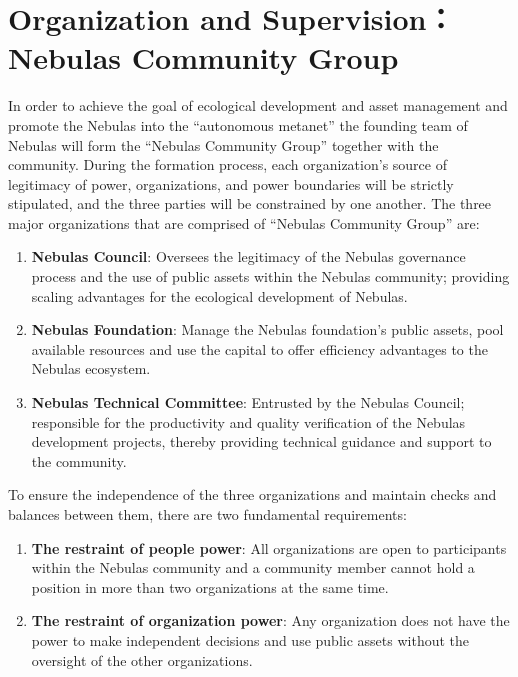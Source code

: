 \section{Organization and Supervision：Nebulas Community Group}

In order to achieve the goal of ecological development and asset management and promote the Nebulas into the “autonomous metanet” the founding team of Nebulas will form the “Nebulas Community Group” together with the community. During the formation process, each organization’s source of legitimacy of power, organizations, and power boundaries will be strictly stipulated, and the three parties will be constrained by one another. The three major organizations that are comprised of “Nebulas Community Group” are:

\begin{enumerate}
	\item \textbf{Nebulas Council}: Oversees the legitimacy of the Nebulas governance process and the use of public assets within the Nebulas community; providing scaling advantages for the ecological development of Nebulas.
	\item \textbf{Nebulas Foundation}: Manage the Nebulas foundation’s public assets, pool available resources and use the capital to offer efficiency advantages to the Nebulas ecosystem.
	\item \textbf{Nebulas Technical Committee}: Entrusted by the Nebulas Council; responsible for the productivity and quality verification of the Nebulas development projects, thereby providing technical guidance and support to the community.
\end{enumerate}

\vspace{2em}

To ensure the independence of the three organizations and maintain checks and balances between them, there are two fundamental requirements:

\begin{enumerate}
	\item \textbf{The restraint of people power}: All organizations are open to participants within the Nebulas community and a community member cannot hold a position in more than two organizations at the same time.
	\item \textbf{The restraint of organization power}: Any organization does not have the power to make independent decisions and use public assets without the oversight of the other organizations.
\end{enumerate}

